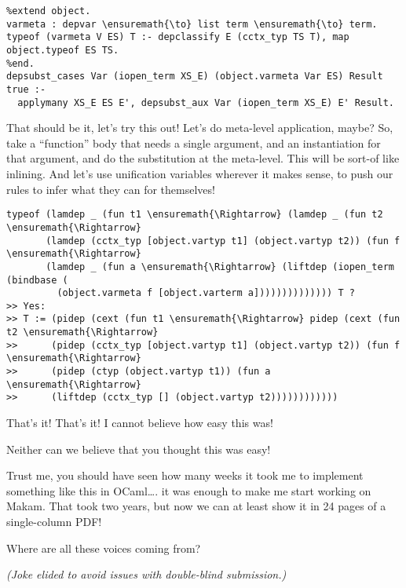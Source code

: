 \begin{verbatim}
%extend object.
varmeta : depvar \ensuremath{\to} list term \ensuremath{\to} term.
typeof (varmeta V ES) T :- depclassify E (cctx_typ TS T), map object.typeof ES TS.
%end.
depsubst_cases Var (iopen_term XS_E) (object.varmeta Var ES) Result true :-
  applymany XS_E ES E', depsubst_aux Var (iopen_term XS_E) E' Result.
\end{verbatim}

\heroADVISOR{} That should be it, let's try this out! Let's do meta-level
application, maybe? So, take a ``function'' body that needs a single
argument, and an instantiation for that argument, and do the
substitution at the meta-level. This will be sort-of like inlining. And
let's use unification variables wherever it makes sense, to push our
rules to infer what they can for themselves!

\begin{verbatim}
typeof (lamdep _ (fun t1 \ensuremath{\Rightarrow} (lamdep _ (fun t2 \ensuremath{\Rightarrow}
       (lamdep (cctx_typ [object.vartyp t1] (object.vartyp t2)) (fun f \ensuremath{\Rightarrow}
       (lamdep _ (fun a \ensuremath{\Rightarrow} (liftdep (iopen_term (bindbase (
         (object.varmeta f [object.varterm a]))))))))))))) T ?
>> Yes:
>> T := (pidep (cext (fun t1 \ensuremath{\Rightarrow} pidep (cext (fun t2 \ensuremath{\Rightarrow}
>>      (pidep (cctx_typ [object.vartyp t1] (object.vartyp t2)) (fun f \ensuremath{\Rightarrow}
>>      (pidep (ctyp (object.vartyp t1)) (fun a \ensuremath{\Rightarrow}
>>      (liftdep (cctx_typ [] (object.vartyp t2))))))))))))
\end{verbatim}

\heroSTUDENT{} That's it! That's it! I cannot believe how easy this was!

\heroAUDIENCE{} Neither can we believe that you thought this was easy!

\heroAUTHOR{} Trust me, you should have seen how many weeks it took me to
implement something like this in OCaml\ldots{}. it was enough to make me
start working on Makam. That took two years, but now we can at least
show it in 24 pages of a single-column PDF!

\heroADVISOR{} Where are all these voices coming from?

\heroSTUDENT{}
\textit{(Joke elided to avoid issues with double-blind submission.)}
